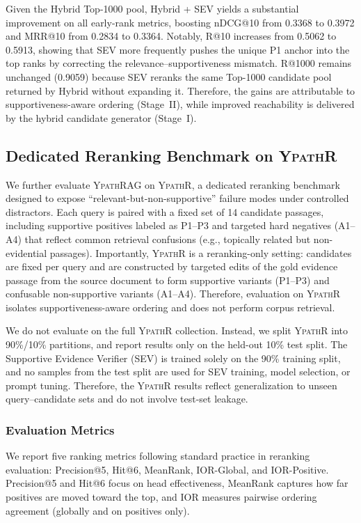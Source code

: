 \documentclass[preprint,12pt,a4paper]{elsarticle}
\newcommand{\method}{\textsc{Ypath\-RAG}}
\begin{document}
Given the Hybrid Top-1000 pool, Hybrid + SEV yields a substantial improvement on all early-rank metrics, boosting nDCG@10 from 0.3368 to 0.3972 and MRR@10 from 0.2834 to 0.3364.
Notably, R@10 increases from 0.5062 to 0.5913, showing that SEV more frequently pushes the unique P1 anchor into the top ranks by correcting the relevance--supportiveness mismatch.
R@1000 remains unchanged (0.9059) because SEV reranks the same Top-1000 candidate pool returned by Hybrid without expanding it.
Therefore, the gains are attributable to supportiveness-aware ordering (Stage~II), while improved reachability is delivered by the hybrid candidate generator (Stage~I).

\subsection{Dedicated Reranking Benchmark on \textsc{YpathR}}
\label{subsec:exp_ypathr}

We further evaluate \method{} on \textsc{YpathR}, a dedicated reranking benchmark designed to expose ``relevant-but-non-supportive'' failure modes under controlled distractors.
Each query is paired with a fixed set of 14 candidate passages, including supportive positives labeled as P1--P3 and targeted hard negatives (A1--A4) that reflect common retrieval confusions (e.g., topically related but non-evidential passages).
Importantly, \textsc{YpathR} is a reranking-only setting: candidates are fixed per query and are constructed by targeted edits of the gold evidence passage from the source document to form supportive variants (P1--P3) and confusable non-supportive variants (A1--A4). Therefore, evaluation on \textsc{YpathR} isolates supportiveness-aware ordering and does not perform corpus retrieval.


We do not evaluate on the full \textsc{YpathR} collection.
Instead, we split \textsc{YpathR} into 90\%/10\% partitions, and report results only on the held-out 10\% test split.
The Supportive Evidence Verifier (SEV) is trained solely on the 90\% training split, and no samples from the test split are used for SEV training, model selection, or prompt tuning.
Therefore, the \textsc{YpathR} results reflect generalization to unseen query--candidate sets and do not involve test-set leakage.

\subsubsection{Evaluation Metrics}
\label{subsubsec:ypathr_metrics}
We report five ranking metrics following standard practice in reranking evaluation: Precision@5, Hit@6, MeanRank, IOR-Global, and IOR-Positive.
Precision@5 and Hit@6 focus on head effectiveness, MeanRank captures how far positives are moved toward the top, and IOR measures pairwise ordering agreement (globally and on positives only).
\end{document}
